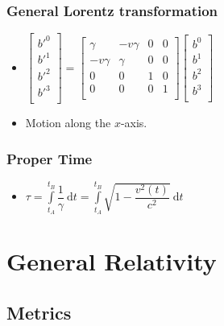 \documentclass[]{report}
\newcommand \tab[1][1cm]{\hspace*{#1}}
\newcommand{\dn}[1]{\ \mathrm{d}#1}
\newcommand{\itemt}{\item \tab}
\begin{document}
\subsubsection{General Lorentz transformation}
\begin{itemize}
\itemt 
\( \begin{bmatrix}
b'^0 \\
b'^1 \\
b'^2 \\
b'^3 \\
\end{bmatrix} =
\begin{bmatrix}
\gamma 		&-v\gamma	&0	&0 	\\
-v\gamma 	&\gamma		&0	&0	\\
0 			&0			&1	&0	\\
0 			&0			&0	&1	\\
\end{bmatrix}
\begin{bmatrix}
b^0 \\
b^1 \\
b^2 \\
b^3 \\
\end{bmatrix} \)
\itemt Motion along the $x$-axis.
\end{itemize}


\subsubsection{Proper Time}
\begin{itemize}
\itemt \( \tau = \int\limits_{t_A}^{t_B} \dfrac{1}{\gamma} \dn t =\int\limits_{t_A}^{t_B} \sqrt{1 - \dfrac{{v}^2(t)}{c^2}} \dn t \)
\end{itemize}

	\section{General Relativity}
    
		\subsection{Metrics}
\end{document}
